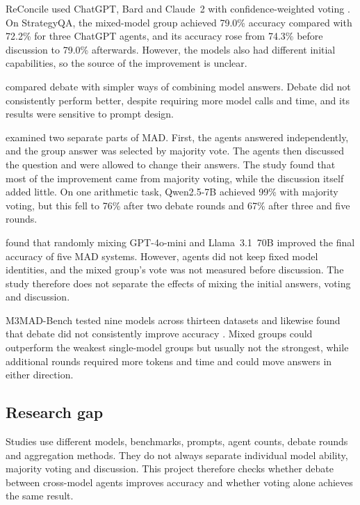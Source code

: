 \documentclass[12pt,a4paper]{article}
\begin{document}
ReConcile used ChatGPT, Bard and Claude~2 with confidence-weighted voting
\citep{chen2024reconcile}. On StrategyQA, the mixed-model group achieved 79.0\%
accuracy compared with 72.2\% for three ChatGPT agents, and its accuracy rose
from 74.3\% before discussion to 79.0\% afterwards. However, the models also had
different initial capabilities, so the source of the improvement is unclear.

\citet{smit2024mad} compared debate with simpler ways of combining model
answers. Debate did not consistently perform better, despite requiring more
model calls and time, and its results were sensitive to prompt design.

\citet{choi2025debate} examined two separate parts of MAD. First, the agents
answered independently, and the group answer was selected by majority vote. The
agents then discussed the question and were allowed to change their answers.
The study found that most of the improvement came from majority voting, while
the discussion itself added little. On one arithmetic task, Qwen2.5-7B achieved
99\% with majority voting, but this fell to 76\% after two debate rounds and
67\% after three and five rounds.

\citet{zhang2025heterogeneity} found that randomly mixing GPT-4o-mini and
Llama~3.1~70B improved the final accuracy of five MAD systems. However, agents
did not keep fixed model identities, and the mixed group's vote was not measured
before discussion. The study therefore does not separate the effects of mixing
the initial answers, voting and discussion.

M3MAD-Bench tested nine models across thirteen datasets and likewise found that
debate did not consistently improve accuracy \citep{li2026m3mad}. Mixed groups
could outperform the weakest single-model groups but usually not the strongest,
while additional rounds required more tokens and time and could move answers in
either direction.

\subsection{Research gap}

Studies use different models, benchmarks, prompts, agent counts, debate rounds
and aggregation methods. They do not always separate individual model ability,
majority voting and discussion. This project therefore checks whether debate
between cross-model agents improves accuracy and whether voting alone achieves
the same result.
\end{document}
